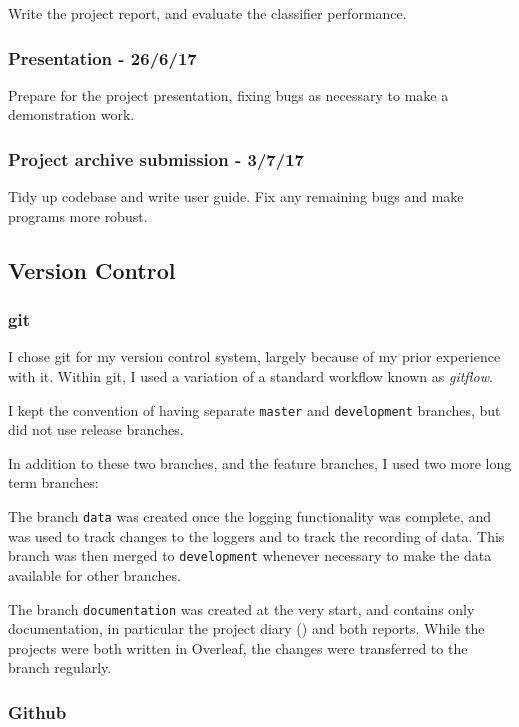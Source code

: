 \documentclass[a4paper]{article}
\begin{document}
Write the project report, and evaluate the classifier performance. 

\subsubsection{Presentation - 26/6/17}

Prepare for the project presentation, fixing bugs as necessary to make a demonstration work. 

\subsubsection{Project archive submission - 3/7/17}

Tidy up codebase and write user guide. Fix any remaining bugs and make programs more robust.

\subsection{Version Control}%

\subsubsection{git}

I chose git\cite{ppref0} for my version control system, largely because of my prior experience with it. Within git, I used a variation of a standard workflow known as \textit{gitflow}.\cite{ppref1} 

I kept the convention of having separate \lstinline{master} and \lstinline{development} branches, but did not use release branches. 

In addition to these two branches, and the feature branches, I used two more long term branches:

The branch \lstinline{data} was created once the logging functionality was complete, and was used to track changes to the loggers and to track the recording of data. This branch was then merged to \lstinline{development} whenever necessary to make the data available for other branches.

The branch \lstinline{documentation} was created at the very start, and contains only documentation, in particular the project diary () and both reports. While the projects were both written in Overleaf, the changes were transferred to the branch regularly.

\subsubsection{Github}
\end{document}
